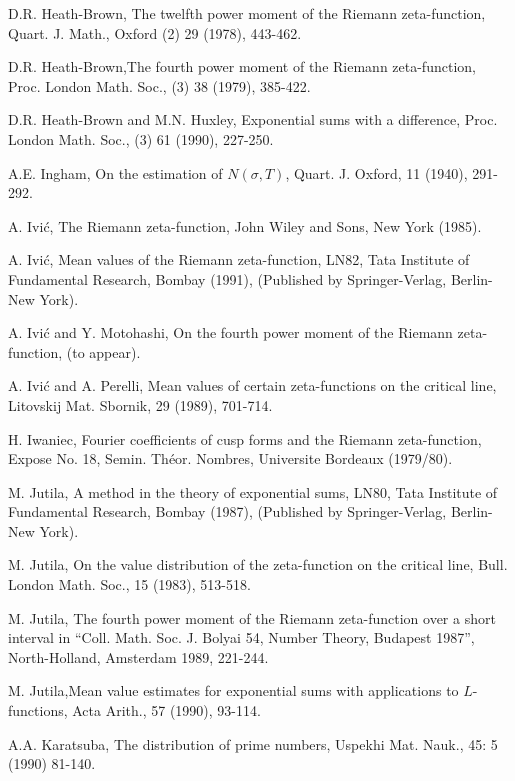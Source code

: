 \begin{thebibliography}{99}
 D.R. Heath-Brown, The twelfth power moment of the Riemann zeta-function, Quart. J. Math., Oxford (2) 29 (1978), 443-462.

 D.R. Heath-Brown,\pageoriginale The fourth power moment of the Riemann zeta-function, Proc. London Math. Soc., (3) 38 (1979), 385-422.

 D.R. Heath-Brown and M.N. Huxley, Exponential sums with a difference, Proc. London Math. Soc., (3) 61 (1990), 227-250.

 A.E. Ingham, On the estimation of $N(\sigma,T)$, Quart. J. Oxford, 11 (1940), 291-292.

 A. Ivi\'c, The Riemann zeta-function, John Wiley and Sons, New York (1985). 

 A. Ivi\'c, Mean values of the Riemann zeta-function, LN82, Tata Institute of Fundamental Research, Bombay (1991), (Published by Springer-Verlag, Berlin-New York).

 A. Ivi\'c and Y. Motohashi, On the fourth power moment of the Riemann zeta-function, (to appear).

 A. Ivi\'c and A. Perelli, Mean values of certain zeta-functions on the critical line, Litovskij Mat. Sbornik, 29 (1989), 701-714.

 H. Iwaniec, Fourier coefficients of cusp forms and the Riemann zeta-function, Expose No. 18, Semin. Th\'eor. Nombres, Universite Bordeaux (1979/80).

 M. Jutila, A method in the theory of exponential sums, LN80, Tata Institute of Fundamental Research, Bombay (1987), (Published by Springer-Verlag, Berlin-New York).

 M. Jutila, On the value distribution of the zeta-function on the critical line, Bull. London Math. Soc., 15 (1983), 513-518.

 M. Jutila, The fourth power moment of the Riemann zeta-function over a short interval in ``Coll. Math. Soc. J. Bolyai 54, Number Theory, Budapest 1987'', North-Holland, Amsterdam 1989, 221-244.

 M. Jutila,\pageoriginale Mean value estimates for exponential sums with applications to $L$-functions, Acta Arith., 57 (1990), 93-114.

 A.A. Karatsuba, The distribution of prime numbers, Uspekhi Mat. Nauk., 45: 5 (1990) 81-140.


\end{thebibliography}
